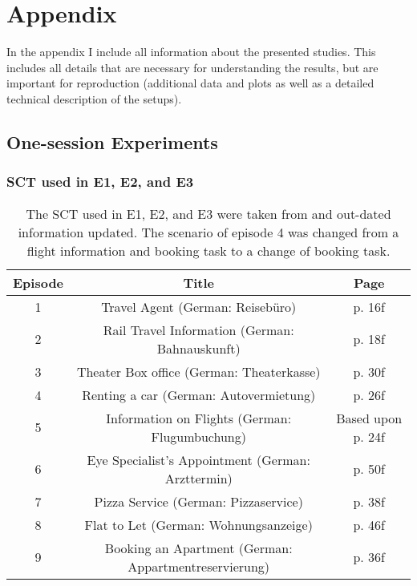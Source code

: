 \chapter{Appendix}\label{chap:appendix}
\begin{chapter-abstract}
In the appendix I include all information about the presented studies.
This includes all details that are necessary for understanding the results, but are important for reproduction (additional data and plots as well as a detailed technical description of the setups).
\end{chapter-abstract}


\section{One-session Experiments}\label{appendix:laboratorySetups}

\subsection{\acs{SCT} used in E1, E2, and E3}
\begin{table}
	\centering
	\begin{tabular}{c|c|c}
	Episode & Title & Page \\
	\hline
	1 & Travel Agent (German: Reisebüro) & p. 16f \\
	2 & Rail Travel Information (German: Bahnauskunft) & p. 18f \\
	3 & Theater Box office (German: Theaterkasse) & p. 30f \\
	4 & Renting a car (German: Autovermietung) & p. 26f \\
	5 & Information on Flights (German: Flugumbuchung) & Based upon p. 24f \\
	6 & Eye Specialist's Appointment (German: Arzttermin) & p. 50f \\
	7 & Pizza Service (German: Pizzaservice) & p. 38f \\
	8 & Flat to Let (German: Wohnungsanzeige) & p. 46f \\
	9 & Booking an Apartment (German: Appartmentreservierung) & p. 36f \\
	\end{tabular}
	\caption{The \acs{SCT} used in E1, E2, and E3 were taken from \cite{itu-t_p.805:_2007} and out-dated information updated. The scenario of episode 4 was changed from a flight information and booking task to a change of booking task.}
	\label{tab:appendix:labsct}
\end{table}

